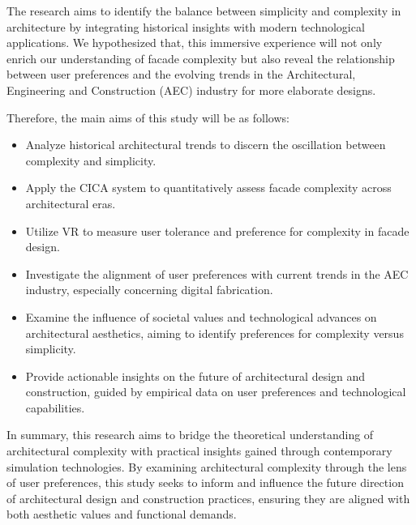 The research aims to identify the balance between simplicity and complexity in architecture by integrating historical insights with modern technological applications.
We hypothesized that, this immersive experience will not only enrich our understanding of facade complexity but also reveal the relationship between user preferences and the evolving trends in the Architectural, Engineering and Construction (AEC) industry for more elaborate designs.

Therefore, the main aims of this study will be as follows:

\begin{itemize}
    \item Analyze historical architectural trends to discern the oscillation between complexity and simplicity.
    \item Apply the CICA system to quantitatively assess facade complexity across architectural eras.
    \item Utilize VR to measure user tolerance and preference for complexity in facade design.
    \item Investigate the alignment of user preferences with current trends in the AEC industry, especially concerning digital fabrication.
    \item Examine the influence of societal values and technological advances on architectural aesthetics, aiming to identify preferences for complexity versus simplicity.
    \item Provide actionable insights on the future of architectural design and construction, guided by empirical data on user preferences and technological capabilities.
\end{itemize}



In summary, this research aims to bridge the theoretical understanding of architectural complexity with practical insights gained through contemporary simulation technologies.
By examining architectural complexity through the lens of user preferences, this study seeks to inform and influence the future direction of architectural design and construction practices, ensuring they are aligned with both aesthetic values and functional demands.




